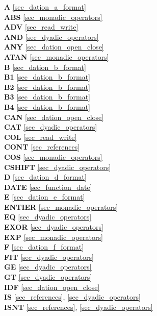 {
{\bf A} \ref{sec_dation_a_format}\\
{\bf ABS} \ref{sec_monadic_operators}\\
{\bf ADV} \ref{sec_read_write}\\
{\bf AND} \ref{sec_dyadic_operators}\\
{\bf ANY} \ref{sec_dation_open_close}\\
{\bf ATAN} \ref{sec_monadic_operators}\\

{\bf B} \ref{sec_dation_b_format}\\
{\bf B1} \ref{sec_dation_b_format}\\
{\bf B2} \ref{sec_dation_b_format}\\
{\bf B3} \ref{sec_dation_b_format}\\
{\bf B4} \ref{sec_dation_b_format}\\

{\bf CAN} \ref{sec_dation_open_close}\\
{\bf CAT} \ref{sec_dyadic_operators}\\
{\bf COL} \ref{sec_read_write}\\
{\bf CONT} \ref{sec_references}\\
{\bf COS} \ref{sec_monadic_operators}\\
{\bf CSHIFT} \ref{sec_dyadic_operators}\\
 
{\bf D} \ref{sec_dation_d_format}\\
{\bf DATE} \ref{sec_function_date}\\
 
{\bf E} \ref{sec_dation_e_format}\\
{\bf ENTIER} \ref{sec_monadic_operators}\\
{\bf EQ} \ref{sec_dyadic_operators}\\
{\bf EXOR} \ref{sec_dyadic_operators}\\
{\bf EXP} \ref{sec_monadic_operators}\\
 
{\bf F} \ref{sec_dation_f_format}\\
{\bf FIT} \ref{sec_dyadic_operators}\\
 
{\bf GE} \ref{sec_dyadic_operators}\\
{\bf GT} \ref{sec_dyadic_operators}\\
 
{\bf IDF} \ref{sec_dation_open_close}\\
{\bf IS} \ref{sec_references}, \ref{sec_dyadic_operators}\\
{\bf ISNT} \ref{sec_references}, \ref{sec_dyadic_operators}\\

}

